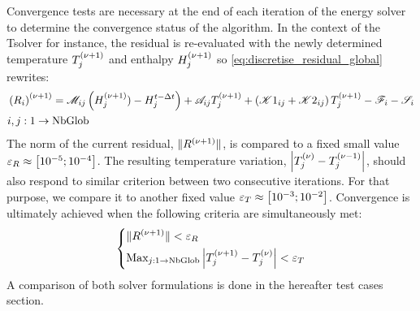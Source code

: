 Convergence tests are necessary at the end of each iteration of the energy solver to determine 
the convergence status of the algorithm. In the context of the Tsolver for instance, the residual 
is re-evaluated with the newly determined temperature $\Tj^\iterplus$ and enthalpy $\Hj^\iterplus$ so \cref{eq:discretise_residual_global} rewrites:
\begin{align}
\begin{split}
\label{eq:discretise_residual_global_new}
& \brac{R_i}^\iterplus = \Mij \brac{\Hj^\iterplus) - \Hjtminus} + \Aij \Tj^\iterplus + \brac{\Kija + \Kijb}\Tj^\iterplus -\Fi - \Si \\
& i,j:1 \rightarrow \text{NbGlob}
\end{split}
\end{align}
The norm of the current residual, $\norm{R^\iterplus}$, is compared to a fixed small 
value $\varepsilon_R \approx \crochet{\num{d-5};\num{d-4}}$. The resulting temperature variation, 
$\abval{\Tj^\iter-\Tj^\iterminus}$, should also respond to similar criterion between two consecutive 
iterations. For that purpose, we compare it to another fixed value $\varepsilon_T \approx \crochet{\num{d-3};\num{d-2}}$.
Convergence is ultimately achieved when the following criteria are simultaneously met:
\begin{equation}
\label{eq:energy_convergence_criteria}
   \left\{
   \begin{aligned}
      & \norm{R^\iterplus} < \varepsilon_R \\
	  & \text{Max}_{j:1 \rightarrow \text{NbGlob}} \abval{\Tj^\iterplus-\Tj^\iter} < \varepsilon_T
    \end{aligned}
    \right.
\end{equation}
A comparison of both solver formulations is done in the hereafter test cases section.
%
%
%
